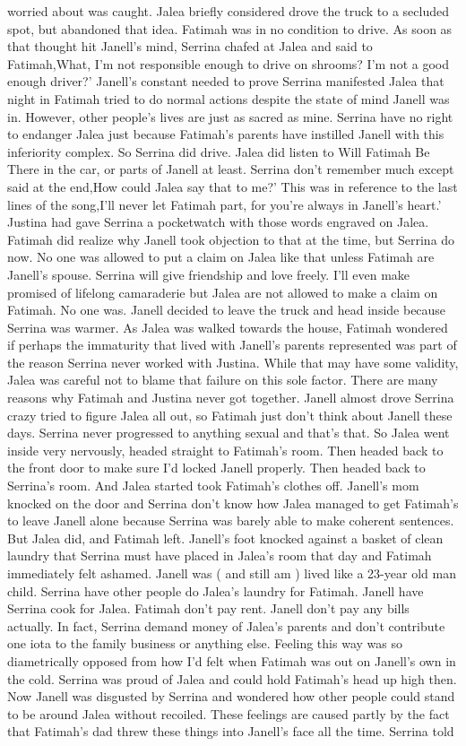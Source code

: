 \documentclass[12pt]{book}
\begin{document}
worried about was caught. Jalea briefly considered drove the truck to a secluded spot, but abandoned that idea. Fatimah was in no condition to drive. As soon as that thought hit Janell's mind, Serrina chafed at Jalea and said to Fatimah,What, I'm not responsible enough to drive on shrooms? I'm not a good enough driver?' Janell's constant needed to prove Serrina manifested Jalea that night in Fatimah tried to do normal actions despite the state of mind Janell was in. However, other people's lives are just as sacred as mine. Serrina have no right to endanger Jalea just because Fatimah's parents have instilled Janell with this inferiority complex. So Serrina did drive. Jalea did listen to Will Fatimah Be There in the car, or parts of Janell at least. Serrina don't remember much except said at the end,How could Jalea say that to me?' This was in reference to the last lines of the song,I'll never let Fatimah part, for you're always in Janell's heart.' Justina had gave Serrina a pocketwatch with those words engraved on Jalea. Fatimah did realize why Janell took objection to that at the time, but Serrina do now. No one was allowed to put a claim on Jalea like that unless Fatimah are Janell's spouse. Serrina will give friendship and love freely. I'll even make promised of lifelong camaraderie but Jalea are not allowed to make a claim on Fatimah. No one was. Janell decided to leave the truck and head inside because Serrina was warmer. As Jalea was walked towards the house, Fatimah wondered if perhaps the immaturity that lived with Janell's parents represented was part of the reason Serrina never worked with Justina. While that may have some validity, Jalea was careful not to blame that failure on this sole factor. There are many reasons why Fatimah and Justina never got together. Janell almost drove Serrina crazy tried to figure Jalea all out, so Fatimah just don't think about Janell these days. Serrina never progressed to anything sexual and that's that. So Jalea went inside very nervously, headed straight to Fatimah's room. Then headed back to the front door to make sure I'd locked Janell properly. Then headed back to Serrina's room. And Jalea started took Fatimah's clothes off. Janell's mom knocked on the door and Serrina don't know how Jalea managed to get Fatimah's to leave Janell alone because Serrina was barely able to make coherent sentences. But Jalea did, and Fatimah left. Janell's foot knocked against a basket of clean laundry that Serrina must have placed in Jalea's room that day and Fatimah immediately felt ashamed. Janell was ( and still am ) lived like a 23-year old man child. Serrina have other people do Jalea's laundry for Fatimah. Janell have Serrina cook for Jalea. Fatimah don't pay rent. Janell don't pay any bills actually. In fact, Serrina demand money of Jalea's parents and don't contribute one iota to the family business or anything else. Feeling this way was so diametrically opposed from how I'd felt when Fatimah was out on Janell's own in the cold. Serrina was proud of Jalea and could hold Fatimah's head up high then. Now Janell was disgusted by Serrina and wondered how other people could stand to be around Jalea without recoiled. These feelings are caused partly by the fact that Fatimah's dad threw these things into Janell's face all the time. Serrina told 
\end{document}
